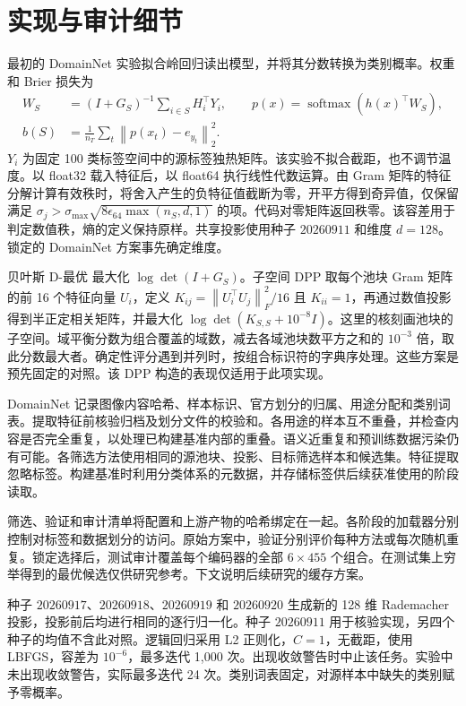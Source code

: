 \documentclass[UTF8,fontset=fandol,scheme=chinese,zihao=false,11pt,letterpaper]{ctexart}
\newcommand{\norm}[1]{\left\lVert#1\right\rVert}
\begin{document}
\section{实现与审计细节}
\label{app:protocol}
最初的 DomainNet 实验拟合岭回归读出模型，并将其分数转换为类别概率。权重和 Brier 损失为
\begin{equation}
 \begin{aligned}
 W_S&=(I+G_S)^{-1}\sum_{i\in S}H_i^\top Y_i,\qquad
 p(x)=\operatorname{softmax}(h(x)^\top W_S),\\
 b(S)&=\frac1{n_T}\sum_t\norm{p(x_t)-e_{y_t}}_2^2.
 \end{aligned}
\end{equation}
$Y_i$ 为固定 100 类标签空间中的源标签独热矩阵。该实验不拟合截距，也不调节温度。以 float32 载入特征后，以 float64 执行线性代数运算。由 Gram 矩阵的特征分解计算有效秩时，将舍入产生的负特征值截断为零，开平方得到奇异值，仅保留满足 $\sigma_j>\sigma_{\max}\sqrt{8\epsilon_{64}\max(n_S,d,1)}$ 的项。代码对零矩阵返回秩零。该容差用于判定数值秩，熵的定义保持原样。共享投影使用种子 $20260911$ 和维度 $d=128$。锁定的 DomainNet 方案事先确定维度。

贝叶斯 D-最优 最大化 $\log\det(I+G_S)$。子空间 DPP 取每个池块 Gram 矩阵的前 16 个特征向量 $U_i$，定义 $K_{ij}=\norm{U_i^\top U_j}_F^2/16$ 且 $K_{ii}=1$，再通过数值投影得到半正定相关矩阵，并最大化 $\log\det(K_{S,S}+10^{-8}I)$。这里的核刻画池块的子空间。域平衡分数为组合覆盖的域数，减去各域池块数平方之和的 $10^{-3}$ 倍，取此分数最大者。确定性评分遇到并列时，按组合标识符的字典序处理。这些方案是预先固定的对照。该 DPP 构造的表现仅适用于此项实现。

DomainNet 记录图像内容哈希、样本标识、官方划分的归属、用途分配和类别词表。提取特征前核验归档及划分文件的校验和。各用途的样本互不重叠，并检查内容是否完全重复，以处理已构建基准内部的重叠。语义近重复和预训练数据污染仍有可能。各筛选方法使用相同的源池块、投影、目标筛选样本和候选集。特征提取忽略标签。构建基准时利用分类体系的元数据，并存储标签供后续获准使用的阶段读取。

筛选、验证和审计清单将配置和上游产物的哈希绑定在一起。各阶段的加载器分别控制对标签和数据划分的访问。原始方案中，验证分别评价每种方法或每次随机重复。锁定选择后，测试审计覆盖每个编码器的全部 $6\times455$ 个组合。在测试集上穷举得到的最优候选仅供研究参考。下文说明后续研究的缓存方案。

种子 $20260917$、$20260918$、$20260919$ 和 $20260920$ 生成新的 128 维 Rademacher 投影，投影前后均进行相同的逐行归一化。种子 $20260911$ 用于核验实现，另四个种子的均值不含此对照。逻辑回归采用 L2 正则化，$C=1$，无截距，使用 LBFGS，容差为 $10^{-6}$，最多迭代 1,000 次。出现收敛警告时中止该任务。实验中未出现收敛警告，实际最多迭代 24 次。类别词表固定，对源样本中缺失的类别赋予零概率。
\end{document}

